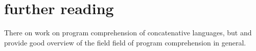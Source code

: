 

\section{further reading}

There on work on program comprehension of concatenative languages, but \cite{Canfora:2011:ACS:1924421.1924451} and \cite{Cornelissen2009} provide good overview of the field field of program comprehension in general.